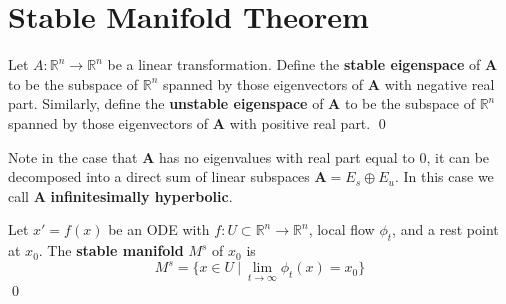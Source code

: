 \section{Stable Manifold Theorem}
\label{stable_manifold_theorem}

 \begin{definition}
 	Let $A: \mathbb{R}^n \to \mathbb{R}^n$ be a linear transformation. Define the \textbf{stable eigenspace} of $\mathbf{A}$ to be the subspace of $\mathbb{R}^n$ spanned by those eigenvectors of $\mathbf{A}$ with negative real part. Similarly, define the \textbf{unstable eigenspace} of $\mathbf{A}$ to be the subspace of $\mathbb{R}^n$ spanned by those eigenvectors of $\mathbf{A}$ with positive real part. %
 	\qed
 \end{definition}
 
 Note in the case that $\mathbf{A}$ has no eigenvalues with real part equal to 0, it can be decomposed into a direct sum of linear subspaces $\mathbf{A} = E_s \oplus E_u$. In this case we call $\mathbf{A}$ \textbf{infinitesimally hyperbolic}.
 
 \begin{definition}
 	Let $x' = f(x)$ be an ODE with $f:U \subset \mathbb{R}^n \to \mathbb{R}^n$, local flow $\phi_t$, and a rest point at $x_0$. The \textbf{stable manifold} $M^s$ %
 	of $x_0$ is %
 	$$M^s = \{x \in U ~|~ \lim\limits_{t \to \infty} \phi_t(x)= x_0\}$$ 
 	\qed
 \end{definition}
 
 

